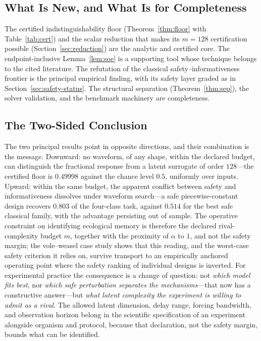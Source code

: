 \documentclass[mathematics,article,accept,pdftex,moreauthors]{Definitions/mdpi}
\begin{document}
\subsection{What Is New, and What Is for Completeness}

The certified indistinguishability floor (Theorem~\ref{thm:floor} with Table~\ref{tab:cert}) and the scalar reduction that makes its $m=128$ certification possible (Section~\ref{sec:reduction}) are the analytic and certified core. The endpoint-inclusive Lemma~\ref{lem:soe} is a supporting tool whose technique belongs to the cited literature. The refutation of the classical safety--informativeness frontier is the principal empirical finding, with its safety layer graded as in Section~\ref{sec:safety-status}. The structural separation (Theorem~\ref{thm:sep}), the solver validation, and the benchmark machinery are completeness.

\subsection{The Two-Sided Conclusion}

The two principal results point in opposite directions, and their combination is the message. Downward: no waveform, of any shape, within the declared budget, can distinguish the fractional response from a latent surrogate of order $128$---the certified floor is $0.49998$ against the chance level $0.5$, uniformly over inputs. Upward: within the same budget, the apparent conflict between safety and informativeness dissolves under waveform search---a safe piecewise-constant design recovers $0.803$ of the four-class task, against $0.514$ for the best safe classical family, with the advantage persisting out of sample. The operative constraint on identifying ecological memory is therefore the declared rival-complexity budget $m$, together with the proximity of $\alpha$ to $1$, and not the safety margin; the vole--weasel case study shows that this reading, and the worst-case safety criterion it relies on, survive transport to an empirically anchored operating point where the safety ranking of individual designs is inverted. For experimental practice the consequence is a change of question: not \emph{which model fits best}, nor \emph{which safe perturbation separates the mechanisms}---that now has a constructive answer---but \emph{what latent complexity the experiment is willing to admit as a rival}. The allowed latent dimension, delay range, forcing bandwidth, and observation horizon belong in the scientific specification of an experiment alongside organism and protocol, because that declaration, not the safety margin, bounds what can be identified.
\end{document}
